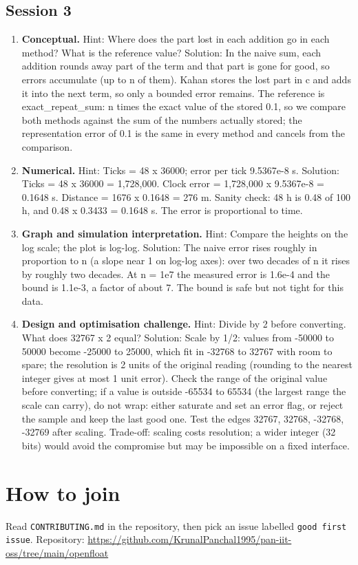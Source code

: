 \documentclass[11pt,a4paper]{article}
\begin{document}
\subsection*{Session 3}
\begin{enumerate}[nosep]
\item \textbf{Conceptual.} Hint: Where does the part lost in each addition go in each method? What is the reference value? Solution: In the naive sum, each addition rounds away part of the term and that part is gone for good, so errors accumulate (up to n of them). Kahan stores the lost part in c and adds it into the next term, so only a bounded error remains. The reference is exact\_repeat\_sum: n times the exact value of the stored 0.1, so we compare both methods against the sum of the numbers actually stored; the representation error of 0.1 is the same in every method and cancels from the comparison.
\item \textbf{Numerical.} Hint: Ticks = 48 x 36000; error per tick 9.5367e-8 s. Solution: Ticks = 48 x 36000 = 1,728,000. Clock error = 1,728,000 x 9.5367e-8 = 0.1648 s. Distance = 1676 x 0.1648 = 276 m. Sanity check: 48 h is 0.48 of 100 h, and 0.48 x 0.3433 = 0.1648 s. The error is proportional to time.
\item \textbf{Graph and simulation interpretation.} Hint: Compare the heights on the log scale; the plot is log-log. Solution: The naive error rises roughly in proportion to n (a slope near 1 on log-log axes): over two decades of n it rises by roughly two decades. At n = 1e7 the measured error is 1.6e-4 and the bound is 1.1e-3, a factor of about 7. The bound is safe but not tight for this data.
\item \textbf{Design and optimisation challenge.} Hint: Divide by 2 before converting. What does 32767 x 2 equal? Solution: Scale by 1/2: values from -50000 to 50000 become -25000 to 25000, which fit in -32768 to 32767 with room to spare; the resolution is 2 units of the original reading (rounding to the nearest integer gives at most 1 unit error). Check the range of the original value before converting; if a value is outside -65534 to 65534 (the largest range the scale can carry), do not wrap: either saturate and set an error flag, or reject the sample and keep the last good one. Test the edges 32767, 32768, -32768, -32769 after scaling. Trade-off: scaling costs resolution; a wider integer (32 bits) would avoid the compromise but may be impossible on a fixed interface.
\end{enumerate}

\section{How to join}
Read \texttt{CONTRIBUTING.md} in the repository, then pick an issue labelled \texttt{good first issue}. Repository: \url{https://github.com/KrunalPanchal1995/pan-iit-oss/tree/main/openfloat}
\end{document}

